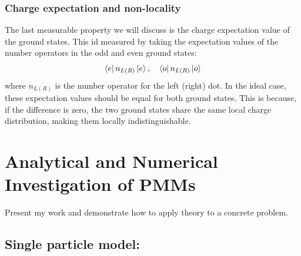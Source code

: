 \documentclass[11pt, letterpaper, titlepage]{article}
\begin{document}
\subsubsection{Charge expectation and non-locality}
The last measurable property we will discuss is the charge expectation value of the ground states. This id measured by taking the expectation values of the number operators in the odd and even ground states:
$$
\bra{e}n_{L(R)} \ket{e}, \quad \bra{o}n_{L(R)} \ket{o}
$$
where $n_{L(R)}$ is the number operator for the left (right) dot. In the ideal case, these expectation values should be equal for both ground states. This is because, if the difference is zero, the two ground states share the same local charge distribution, making them locally indistinguishable. 




















\section{Analytical and Numerical Investigation of PMMs}
Present my work and demonstrate how to apply theory to a concrete problem.\par
\subsection{Single particle model:}
\end{document}
